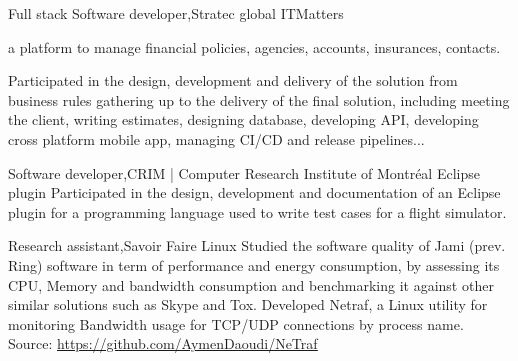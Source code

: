     \resumeSubheading
    {Full stack Software developer,}{Stratec global}{}
    {}
      \resumeItemListStart
      \renewcommand{\labelitemii}{\raisebox{.65cm}{$\bullet$}}
        \resumeItem
         {ITMatters} {a platform to manage financial policies, agencies, accounts, insurances, contacts.

         Participated in the design, development and delivery of the solution from business rules gathering 
         up to the delivery of the final solution, including meeting the client, writing estimates, designing database, 
         developing API, developing cross platform mobile app, managing CI/CD and release pipelines...}
        \renewcommand{\labelitemii}{\scriptsize \raisebox{.25cm}{\ding{118}}}
      \resumeItemListEnd
    
    \resumeSubheading
    {Software developer,}{CRIM | Computer Research Institute of Montréal}{}
    {}
      \resumeItemListStart
      \renewcommand{\labelitemii}{\raisebox{.25cm}{$\bullet$}}
        \resumeItem
         {Eclipse plugin}
         {Participated in the design, development and documentation of an Eclipse plugin for a programming language 
          used to write test cases for a flight simulator.}
        \renewcommand{\labelitemii}{\scriptsize \raisebox{.0cm}{\ding{118}}}
      \resumeItemListEnd

    \resumeSubheading
    {Research assistant,}{Savoir Faire Linux}{}{}
      \resumeItemListStart
        \renewcommand{\labelitemii}{\raisebox{.45cm}{$\bullet$}}
          {Studied the software quality of Jami (prev. Ring) software in term of performance and energy consumption, by assessing 
          its CPU, Memory and bandwidth consumption and benchmarking it against other similar solutions such as Skype and Tox.}
          \renewcommand{\labelitemii}{\raisebox{.25cm}{$\bullet$}}
          {Developed Netraf, a Linux utility for monitoring Bandwidth usage for TCP/UDP connections by process name.
          Source: \underline{\url{https://github.com/AymenDaoudi/NeTraf}}}
        \renewcommand{\labelitemii}{\scriptsize \raisebox{.0cm}{\ding{118}}}
      \resumeItemListEnd 

